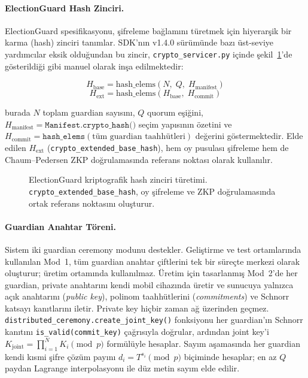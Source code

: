 \documentclass[a4paper,fleqn]{cas-sc}
\begin{document}
\paragraph{ElectionGuard Hash Zinciri.}
ElectionGuard spesifikasyonu, şifreleme bağlamını türetmek için hiyerarşik
bir karma (hash) zinciri tanımlar.
SDK'nın v1.4.0 sürümünde bazı üst-seviye yardımcılar eksik olduğundan bu
zincir, \texttt{crypto\_servicer.py} içinde şekil~\ref{fig:hashchain}'de
gösterildiği gibi manuel olarak inşa edilmektedir:

\begin{equation}
  H_{\text{base}} = \text{hash\_elems}(N,\; Q,\; H_{\text{manifest}})
  \label{eq:base_hash}
\end{equation}
\begin{equation}
  H_{\text{ext}} = \text{hash\_elems}(H_{\text{base}},\; H_{\text{commit}})
  \label{eq:ext_hash}
\end{equation}

burada $N$ toplam guardian sayısını, $Q$ quorum eşiğini,
$H_{\text{manifest}} = \texttt{Manifest.crypto\_hash()}$ seçim yapısının
özetini ve $H_{\text{commit}} = \texttt{hash\_elems}(\text{tüm guardian
taahhütleri})$ değerini göstermektedir.
Elde edilen $H_{\text{ext}}$ (\texttt{crypto\_extended\_base\_hash}), hem
oy pusulası şifreleme hem de Chaum--Pedersen ZKP doğrulamasında referans
noktası olarak kullanılır.

\begin{figure}[ht]
  \centering
  \fbox{\rule{0pt}{4.5cm}\rule{0.85\linewidth}{0pt}}
  \caption{ElectionGuard kriptografik hash zinciri türetimi.
           \texttt{crypto\_extended\_base\_hash}, oy şifreleme ve
           ZKP doğrulamasında ortak referans noktasını oluşturur.}
  \label{fig:hashchain}
\end{figure}

\paragraph{Guardian Anahtar Töreni.}
Sistem iki guardian ceremony modunu destekler.
Geliştirme ve test ortamlarında kullanılan Mod~1, tüm guardian anahtar
çiftlerini tek bir süreçte merkezi olarak oluşturur; üretim ortamında
kullanılmaz.
Üretim için tasarlanmış Mod~2'de her guardian, private anahtarını kendi
mobil cihazında üretir ve sunucuya yalnızca açık anahtarını (\textit{public
key}), polinom taahhütlerini (\textit{commitments}) ve Schnorr katsayı
kanıtlarını iletir.
Private key hiçbir zaman ağ üzerinden geçmez.
\texttt{distributed\_ceremony.create\_joint\_key()} fonksiyonu her
guardian'ın Schnorr kanıtını \texttt{is\_valid(commit\_key)} çağrısıyla
doğrular, ardından joint key'i
$K_{\text{joint}} = \prod_{i=1}^{N} K_i \pmod{p}$
formülüyle hesaplar.
Sayım aşamasında her guardian kendi kısmi şifre çözüm payını
$d_i = T^{s_i} \pmod{p}$ biçiminde hesaplar; en az $Q$ paydan Lagrange
interpolasyonu ile düz metin sayım elde edilir.
\end{document}
